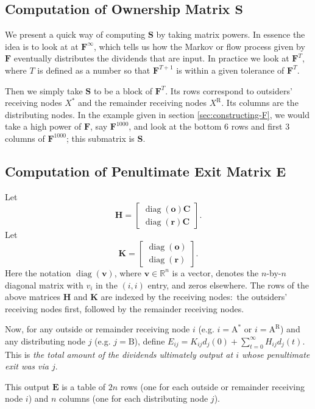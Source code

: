 \documentclass[a4paper,12pt,reqno]{amsart}
\theoremstyle{definition} \newtheorem{example}{Example}
\theoremstyle{definition} \newtheorem{condition}{Condition}
\theoremstyle{definition} \newtheorem{corollary}{Corollary}
\theoremstyle{definition} \newtheorem{claim}{Claim}
\theoremstyle{definition} \newtheorem{definition}{Definition}
\theoremstyle{definition} \newtheorem{conjecture}{Conjecture}
\theoremstyle{definition} \newtheorem{lemma}{Lemma}
\theoremstyle{definition} \newtheorem{theorem}{Theorem}
\theoremstyle{definition} \newtheorem*{theoremNoNumber}{Theorem}
\theoremstyle{definition} \newtheorem*{lemmaCorrespondence}{Lemma \ref{lem:correspondence}}
\theoremstyle{definition}\newtheorem{proposition}{Proposition}
\theoremstyle{definition} \newtheorem{result}{Result}
\theoremstyle{definition} \newtheorem*{definitionNoNumber}{Definition}
\theoremstyle{definition} \newtheorem{assumption}{Assumption}
\theoremstyle{definition} \newtheorem*{assumptionNoNumber}{Assumption}
\theoremstyle{definition} \newtheorem*{fact}{Fact}
\theoremstyle{definition} \newtheorem*{property}{Property}
\theoremstyle{definition} \newtheorem{remark}{Remark}
\newcommand{\R}{\mathbb R}
\DeclareMathOperator{\diag}{diag}
\begin{document}
\subsection{ Computation of Ownership Matrix $\mathbf{S}$} \label{sec:compute-S} 
We present a quick way of computing $\mathbf{S}$ by taking matrix powers. In essence the idea is to look at at $\mathbf{F}^\infty$, which tells us how the Markov or flow process given by $\mathbf{F}$  eventually distributes the dividends that are input. In practice we look at $\mathbf{F}^T$, where $T$ is defined as a number so that $\mathbf{F}^{T+1}$ is within a given tolerance of $\mathbf{F}^T$. 

Then we simply take $\mathbf{S}$ to be a block of $\mathbf{F}^T$. Its rows correspond to outsiders' receiving nodes $X^*$ and the remainder receiving nodes $X^\text{R}$. Its columns are the distributing nodes. In the example given in section \ref{sec:constructing-F}, we would take a high power of $\mathbf{F}$, say $\mathbf{F}^{1000}$, and look at the bottom 6 rows and first 3 columns of $\mathbf{F}^{1000}$; this submatrix is $\mathbf{S}$.

\subsection{Computation of Penultimate Exit Matrix $\mathbf{E}$}  \label{sec:compute-E} Let $$\mathbf{H}=\left[\begin{array}{c}\diag(\mathbf{o}) \mathbf{C} \\ \diag(\mathbf{r}
) \mathbf{C} \end{array}\right].$$ Let $$\mathbf{K}=\left[\begin{array}{c}\diag(\mathbf{o}) \\ \diag(\mathbf{r}
) \end{array}\right].$$ Here the notation $\diag(\mathbf{v})$, where $\mathbf{v} \in \R^n$ is a vector, denotes the $n$-by-$n$ diagonal matrix with $v_i$ in the $(i,i)$ entry, and zeros elsewhere. The rows of the above matrices $\mathbf{H}$ and $\mathbf{K}$ are indexed by the receiving nodes:\ the outsiders' receiving nodes first, followed by the remainder receiving nodes.

Now, for any outside or remainder receiving node $i$ (e.g. $i=\text{A}^*$ or $i=\text{A}^\text{R}$) and any distributing node $j$ (e.g. $j=\text{B}$), define $E_{ij}=K_{ij}d_j(0)+\sum_{t=0}^\infty H_{ij}d_j(t)$. This is \emph{the total amount of the dividends ultimately output at $i$ whose penultimate exit was via $j$}.

This output $\mathbf{E}$ is a table of $2n$ rows (one for each outside or remainder receiving node $i$) and $n$ columns (one for each distributing node $j$).
%
\end{document}
